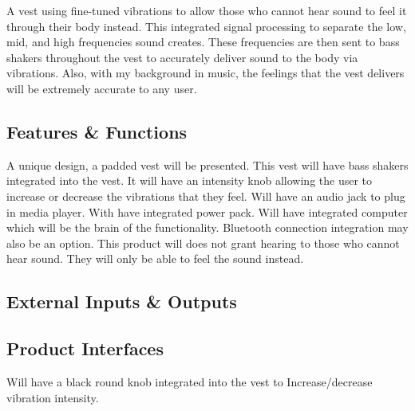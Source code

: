 A vest using fine-tuned vibrations to allow those who cannot hear sound to feel it through their body instead. This integrated signal processing to separate the low, mid, and high frequencies sound creates. These frequencies are then sent to bass shakers throughout the vest to accurately deliver sound to the body via vibrations. Also, with my background in music, the feelings that the vest delivers will be extremely accurate to any user. 

\subsection{Features \& Functions}
A unique design, a padded vest will be presented. This vest will have bass shakers integrated into the vest. It will have an intensity knob allowing the user to increase or decrease the vibrations that they feel. Will have an audio jack to plug in media player. With have integrated power pack. Will have integrated computer which will be the brain of the functionality. Bluetooth connection integration may also be an option. This product will does not grant hearing to those who cannot hear sound. They will only be able to feel the sound instead.

\subsection{External Inputs \& Outputs}
\begin{table}[h]
\end{table}

\subsection{Product Interfaces}
Will have a black round knob integrated into the vest to Increase/decrease vibration intensity. 
